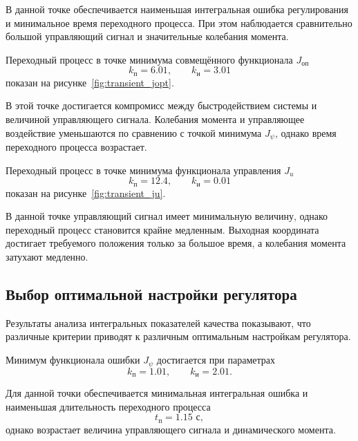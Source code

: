 В данной точке обеспечивается наименьшая интегральная ошибка регулирования и минимальное время переходного процесса. При этом наблюдается сравнительно большой управляющий сигнал и значительные колебания момента.

Переходный процесс в точке минимума совмещённого функционала \(J_{\text{оп}}\)
\begin{equation}
k_{\text{п}} = 6.01,
\qquad
k_{\text{и}} = 3.01
\end{equation}
показан на рисунке~\ref{fig:transient_jopt}.


В этой точке достигается компромисс между быстродействием системы и величиной управляющего сигнала. Колебания момента и управляющее воздействие уменьшаются по сравнению с точкой минимума \(J_{\psi}\), однако время переходного процесса возрастает.

Переходный процесс в точке минимума функционала управления \(J_u\)
\begin{equation}
k_{\text{п}} = 12.4,
\qquad
k_{\text{и}} = 0.01
\end{equation}
показан на рисунке~\ref{fig:transient_ju}.


В данной точке управляющий сигнал имеет минимальную величину, однако переходный процесс становится крайне медленным. Выходная координата достигает требуемого положения только за большое время, а колебания момента затухают медленно.

\subsection{Выбор оптимальной настройки регулятора}

Результаты анализа интегральных показателей качества показывают, что различные критерии приводят к различным оптимальным настройкам регулятора.

Минимум функционала ошибки \(J_{\psi}\) достигается при параметрах
\begin{equation}
k_{\text{п}} = 1.01,
\qquad
k_{\text{и}} = 2.01.
\end{equation}

Для данной точки обеспечивается минимальная интегральная ошибка и наименьшая длительность переходного процесса
\begin{equation}
t_{\text{п}} = 1.15 \text{ с},
\end{equation}
однако возрастает величина управляющего сигнала и динамического момента.

